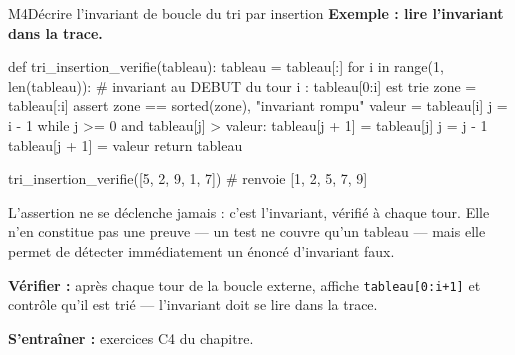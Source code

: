 \begin{fichemethode}{M4}{Décrire l'invariant de boucle du tri par insertion}
\textbf{Exemple : lire l'invariant dans la trace.}
\begin{python}
def tri_insertion_verifie(tableau):
    tableau = tableau[:]
    for i in range(1, len(tableau)):
        # invariant au DEBUT du tour i : tableau[0:i] est trie
        zone = tableau[:i]
        assert zone == sorted(zone), "invariant rompu"
        valeur = tableau[i]
        j = i - 1
        while j >= 0 and tableau[j] > valeur:
            tableau[j + 1] = tableau[j]
            j = j - 1
        tableau[j + 1] = valeur
    return tableau

tri_insertion_verifie([5, 2, 9, 1, 7])   # renvoie [1, 2, 5, 7, 9]
\end{python}
L'assertion ne se déclenche jamais : c'est l'invariant, vérifié à chaque tour. Elle
n'en constitue pas une preuve — un test ne couvre qu'un tableau — mais elle permet de
détecter immédiatement un énoncé d'invariant faux.

\textbf{Vérifier :} après chaque tour de la boucle externe, affiche
\lstinline{tableau[0:i+1]} et contrôle qu'il est trié — l'invariant doit se lire dans la
trace.

\textbf{S'entraîner :} exercices C4 du chapitre.
\end{fichemethode}
